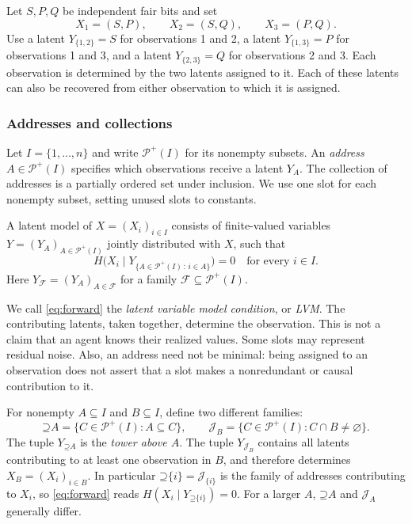 \documentclass[11pt]{article}
\newcommand{\PI}{\mathcal{P}^{+}(I)}
\newcommand{\Up}{\mathord{\supseteq}}
\begin{document}
\begin{example}
\label{eg:bits}
Let $S,P,Q$ be independent fair bits and set
\[
 X_1=(S,P),\qquad X_2=(S,Q),\qquad X_3=(P,Q).
\]
Use a latent $Y_{\{1,2\}}=S$ for observations 1 and 2, a latent
$Y_{\{1,3\}}=P$ for observations 1 and 3, and a latent $Y_{\{2,3\}}=Q$
for observations 2 and 3. Each observation is determined by the two latents
assigned to it. Each of these latents can also be recovered from either
observation to which it is assigned.
\end{example}

\subsubsection{Addresses and collections}
Let $I=\{1,\ldots,n\}$ and write $\PI$ for its nonempty subsets.
An \emph{address} $A\in\PI$ specifies which observations receive a latent
$Y_A$. The collection of addresses is a partially ordered set under inclusion.
We use one slot for each nonempty subset, setting unused slots to constants.

\begin{definition}
\label{def:model}
A latent model of $X=(X_i)_{i\in I}$ consists of finite-valued variables
$Y=(Y_A)_{A\in\PI}$ jointly distributed with $X$, such that
\begin{equation}
 H\bigl(X_i\mid Y_{\{A\in\PI\,:\,i\in A\}}\bigr)=0
 \quad\text{for every }i\in I.
 \label{eq:forward}
\end{equation}
Here $Y_{\mathcal{F}}=(Y_A)_{A\in\mathcal{F}}$ for a family
$\mathcal{F}\subseteq\PI$.
\end{definition}

We call \eqref{eq:forward} the \emph{latent variable model condition}, or
\emph{LVM}. The contributing latents, taken together, determine the
observation. This is not a claim that an agent knows their realized values. Some slots may represent residual noise.
Also, an address need not be minimal: being assigned to an observation does not
assert that a slot makes a nonredundant or causal contribution to it.

For nonempty $A\subseteq I$ and $B\subseteq I$, define two different families:
\[
 \Up A=\{C\in\PI:A\subseteq C\},\qquad
 \mathcal{J}_B=\{C\in\PI:C\cap B\ne\varnothing\}.
\]
The tuple $Y_{\Up A}$ is the \emph{tower above $A$}. The tuple
$Y_{\mathcal{J}_B}$ contains all latents contributing to at least one observation
in $B$, and therefore determines $X_B=(X_i)_{i\in B}$.
In particular $\Up\{i\}=\mathcal{J}_{\{i\}}$ is the family of addresses
contributing to $X_i$, so \eqref{eq:forward} reads $H(X_i\mid Y_{\Up\{i\}})=0$.
For a larger $A$, $\Up A$ and $\mathcal{J}_A$ generally differ.
\end{document}
